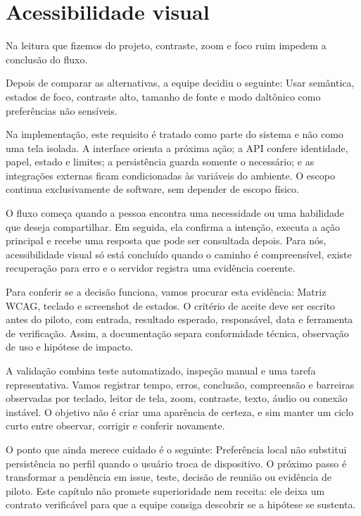 \documentclass[12pt,oneside,a4paper,article]{abntex2}
\begin{document}
\section{Acessibilidade visual}
Na leitura que fizemos do projeto, contraste, zoom e foco ruim impedem a conclusão do fluxo.

Depois de comparar as alternativas, a equipe decidiu o seguinte: Usar semântica, estados de foco, contraste alto, tamanho de fonte e modo daltônico como preferências não sensíveis.

Na implementação, este requisito é tratado como parte do sistema e não como uma tela isolada. A interface orienta a próxima ação; a API confere identidade, papel, estado e limites; a persistência guarda somente o necessário; e as integrações externas ficam condicionadas às variáveis do ambiente. O escopo continua exclusivamente de software, sem depender de escopo físico.

O fluxo começa quando a pessoa encontra uma necessidade ou uma habilidade que deseja compartilhar. Em seguida, ela confirma a intenção, executa a ação principal e recebe uma resposta que pode ser consultada depois. Para nós, acessibilidade visual só está concluído quando o caminho é compreensível, existe recuperação para erro e o servidor registra uma evidência coerente.

Para conferir se a decisão funciona, vamos procurar esta evidência: Matriz WCAG, teclado e screenshot de estados. O critério de aceite deve ser escrito antes do piloto, com entrada, resultado esperado, responsável, data e ferramenta de verificação. Assim, a documentação separa conformidade técnica, observação de uso e hipótese de impacto.

A validação combina teste automatizado, inspeção manual e uma tarefa representativa. Vamos registrar tempo, erros, conclusão, compreensão e barreiras observadas por teclado, leitor de tela, zoom, contraste, texto, áudio ou conexão instável. O objetivo não é criar uma aparência de certeza, e sim manter um ciclo curto entre observar, corrigir e conferir novamente.

O ponto que ainda merece cuidado é o seguinte: Preferência local não substitui persistência no perfil quando o usuário troca de dispositivo. O próximo passo é transformar a pendência em issue, teste, decisão de reunião ou evidência de piloto. Este capítulo não promete superioridade nem receita: ele deixa um contrato verificável para que a equipe consiga descobrir se a hipótese se sustenta.
\end{document}
